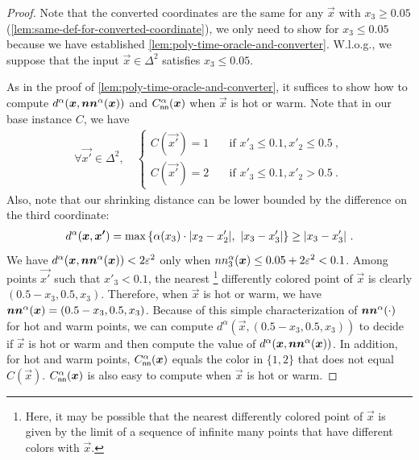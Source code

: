 \begin{proof}
    Note that the converted coordinates are the same for any $\vec{x}$ with $x_3\geq 0.05$ (\cref{lem:same-def-for-converted-coordinate}), we only need to show for $x_3\leq 0.05$ because we have established \cref{lem:poly-time-oracle-and-converter}.
    W.l.o.g., we suppose that the input $\vec{x}\in \Delta^2$ satisfies $x_3\leq 0.05$. 
    
    As in the proof of \cref{lem:poly-time-oracle-and-converter}, it suffices to show how to compute $d^\alpha(\vec{x}, \nna(\vec{x}))$ and $C^\alpha_{\sf nn}(\vec{x})$ when $\vec{x}$ is hot or warm.
    Note that in our base instance $C$, we have 
    \begin{align*}
        \forall \vec{x'}\in \Delta^2, \quad
        \begin{cases}
        C(\vec{x'}) = 1 & \quad \text{if } x'_3\leq 0.1, x'_2 \leq 0.5~,\\
        C(\vec{x'}) = 2 & \quad \text{if } x'_3\leq 0.1, x'_2 > 0.5~.
        \end{cases}
    \end{align*}
    Also, note that our shrinking distance can be lower bounded by the difference on the third coordinate:
    \begin{align*}
        d^{\alpha}(\vec{x}, \vec{x'}) = \max\set{\alpha(x_3)\cdot \abstxt{x_2-x_2'},\ \abstxt{x_3-x_3'}} \geq |x_3-x'_3|~.
    \end{align*}
    We have $d^{\alpha}(\vec{x}, \nna(\vec{x})) < 2\eps^2$ only when $nn_3^{\alpha}(\vec{x})\leq 0.05+2\eps^2<0.1$. 
    Among points $\vec{x'}$ such that $x'_3<0.1$, the nearest \footnote{Here, it may be possible that the nearest differently colored point of $\vec{x}$ is given by the limit of a sequence of infinite many points that have different colors with $\vec{x}$.}
    differently colored point of $\vec{x}$ is clearly $(0.5-x_3,0.5,x_3)$. 
    Therefore, when $\vec{x}$ is hot or warm, we have $\nna(\vec{x})=(0.5-x_3,0.5,x_3)$.
    Because of this simple characterization of $\nna(\cdot)$ for hot and warm points, we can compute $d^{\alpha}(\vec{x}, (0.5-x_3,0.5,x_3))$ to decide if $\vec{x}$ is hot or warm and then compute the value of $d^\alpha(\vec{x}, \nna(\vec{x}))$. 
    In addition, for hot and warm points, $C^\alpha_{\sf nn}(\vec{x})$ equals the color in $\{1,2\}$ that does not equal $C(\vec{x})$. 
    $C^{\alpha}_{\sf nn}(\vec{x})$ is also easy to compute when $\vec{x}$ is hot or warm. 
\end{proof}



